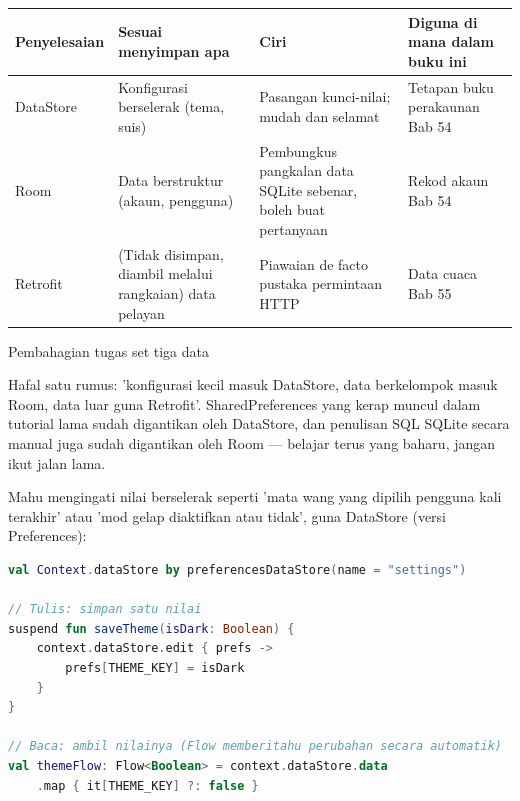 


\begin{center}
\begin{tabularx}{\linewidth}{|X|X|X|X|}
\hline
\textbf{Penyelesaian} & \textbf{Sesuai menyimpan apa} & \textbf{Ciri} & \textbf{Diguna di mana dalam buku ini} \tabularnewline
\hline
DataStore & Konfigurasi berselerak (tema, suis) & Pasangan kunci-nilai; mudah dan selamat & Tetapan buku perakaunan Bab 54 \tabularnewline
Room & Data berstruktur (akaun, pengguna) & Pembungkus pangkalan data SQLite sebenar, boleh buat pertanyaan & Rekod akaun Bab 54 \tabularnewline
Retrofit & (Tidak disimpan, diambil melalui rangkaian) data pelayan & Piawaian de facto pustaka permintaan HTTP & Data cuaca Bab 55 \tabularnewline
\hline
\end{tabularx}
\end{center}

\begin{center}\small\color{gray}Pembahagian tugas set tiga data\end{center}

Hafal satu rumus: 'konfigurasi kecil masuk DataStore, data berkelompok masuk Room, data luar guna Retrofit'. SharedPreferences yang kerap muncul dalam tutorial lama sudah digantikan oleh DataStore, dan penulisan SQL SQLite secara manual juga sudah digantikan oleh Room — belajar terus yang baharu, jangan ikut jalan lama.


Mahu mengingati nilai berselerak seperti 'mata wang yang dipilih pengguna kali terakhir' atau 'mod gelap diaktifkan atau tidak', guna DataStore (versi Preferences):

\begin{lstlisting}[language=Kotlin]
val Context.dataStore by preferencesDataStore(name = "settings")

// Tulis: simpan satu nilai
suspend fun saveTheme(isDark: Boolean) {
    context.dataStore.edit { prefs ->
        prefs[THEME_KEY] = isDark
    }
}

// Baca: ambil nilainya (Flow memberitahu perubahan secara automatik)
val themeFlow: Flow<Boolean> = context.dataStore.data
    .map { it[THEME_KEY] ?: false }
\end{lstlisting}

